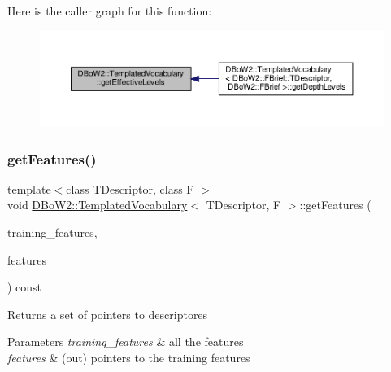 Here is the caller graph for this function\+:\nopagebreak
\begin{figure}[H]
\begin{center}
\leavevmode
\includegraphics[width=350pt]{classDBoW2_1_1TemplatedVocabulary_ae67da4c7b30c15ed4faba2ad6ed4549e_icgraph}
\end{center}
\end{figure}
\mbox{\label{classDBoW2_1_1TemplatedVocabulary_ae2f4fabe99ff93a9d72b4416722f1a78}} 
\subsubsection{\texorpdfstring{get\+Features()}{getFeatures()}}
{\footnotesize\ttfamily template$<$class T\+Descriptor, class F $>$ \\
void \hyperlink{classDBoW2_1_1TemplatedVocabulary}{D\+Bo\+W2\+::\+Templated\+Vocabulary}$<$ T\+Descriptor, F $>$\+::get\+Features (\begin{DoxyParamCaption}\item[{const std\+::vector$<$ std\+::vector$<$ T\+Descriptor $>$ $>$ \&}]{training\+\_\+features,  }\item[{std\+::vector$<$ \hyperlink{classDBoW2_1_1TemplatedVocabulary_a40913d67e369e6993c2eab80a968f829}{p\+Descriptor} $>$ \&}]{features }\end{DoxyParamCaption}) const\hspace{0.3cm}{\ttfamily [protected]}}

Returns a set of pointers to descriptores 
\begin{DoxyParams}{Parameters}
{\em training\+\_\+features} & all the features \\
\hline
{\em features} & (out) pointers to the training features \\
\hline
\end{DoxyParams}


